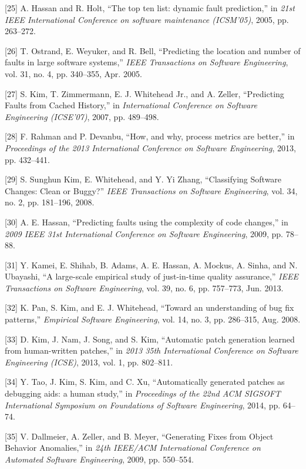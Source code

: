 {[}25{]} A. Hassan and R. Holt, ``The top ten list: dynamic fault prediction,'' in \emph{21st IEEE International Conference on software maintenance (ICSM'05)}, 2005, pp. 263--272.

{[}26{]} T. Ostrand, E. Weyuker, and R. Bell, ``Predicting the location and number of faults in large software systems,'' \emph{IEEE Transactions on Software Engineering}, vol. 31, no. 4, pp. 340--355, Apr. 2005.

{[}27{]} S. Kim, T. Zimmermann, E. J. {Whitehead Jr.}, and A. Zeller, ``Predicting Faults from Cached History,'' in \emph{International Conference on Software Engineering (ICSE'07)}, 2007, pp. 489--498.

{[}28{]} F. Rahman and P. Devanbu, ``How, and why, process metrics are better,'' in \emph{Proceedings of the 2013 International Conference on
Software Engineering}, 2013, pp. 432--441.

{[}29{]} S. {Sunghun Kim}, E. Whitehead, and Y. {Yi Zhang},
``Classifying Software Changes: Clean or Buggy?'' \emph{IEEE
Transactions on Software Engineering}, vol. 34, no. 2, pp. 181--196, 2008.

{[}30{]} A. E. Hassan, ``Predicting faults using the complexity of code changes,'' in \emph{2009 IEEE 31st International Conference on Software Engineering}, 2009, pp. 78--88.

{[}31{]} Y. Kamei, E. Shihab, B. Adams, A. E. Hassan, A. Mockus, A.
Sinha, and N. Ubayashi, ``A large-scale empirical study of just-in-time
quality assurance,'' \emph{IEEE Transactions on Software Engineering},
vol. 39, no. 6, pp. 757--773, Jun. 2013.

{[}32{]} K. Pan, S. Kim, and E. J. Whitehead, ``Toward an understanding
of bug fix patterns,'' \emph{Empirical Software Engineering}, vol. 14,
no. 3, pp. 286--315, Aug. 2008.

{[}33{]} D. Kim, J. Nam, J. Song, and S. Kim, ``Automatic patch
generation learned from human-written patches,'' in \emph{2013 35th
International Conference on Software Engineering (ICSE)}, 2013, vol. 1,
pp. 802--811.

{[}34{]} Y. Tao, J. Kim, S. Kim, and C. Xu, ``Automatically generated
patches as debugging aids: a human study,'' in \emph{Proceedings of the
22nd ACM SIGSOFT International Symposium on Foundations of Software
Engineering}, 2014, pp. 64--74.

{[}35{]} V. Dallmeier, A. Zeller, and B. Meyer, ``Generating Fixes from
Object Behavior Anomalies,'' in \emph{24th IEEE/ACM International
Conference on Automated Software Engineering}, 2009, pp. 550--554.

